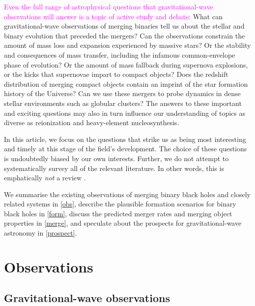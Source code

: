 \documentclass[iop,onecolumn]{revtex4}
\newcommand{\ilya}[1]{\textcolor{magenta}{#1}}
\begin{document}
\ilya{Even the full range of astrophysical questions that gravitational-wave observations will answer is a topic of active study and debate:} What can gravitational-wave observations of merging binaries tell us about the stellar and binary evolution that preceded the mergers?  Can the observations constrain the amount of mass loss and expansion experienced by massive stars? Or the stability and consequences of mass transfer, including the infamous common-envelope phase of evolution? Or the amount of mass fallback during supernova explosions, or the kicks that supernovae impart to compact objects? Does the redshift distribution of merging compact objects contain an imprint of the star formation history of the Universe?  Can we use these mergers to probe dynamics in dense stellar environments such as globular clusters? The answers to these important and exciting questions may also in turn influence our understanding of topics as diverse as reionization and heavy-element nucleosynthesis.

In this article, we focus on the questions that strike us as being most interesting and timely at this stage of the field's development.  The choice of these questions is undoubtedly biased by our own interests. Further, we do not attempt to systematically survey all of the relevant literature.  In other words, this is emphatically {\it not} a review \citep{magritte}. 

We summarise the existing observations of merging binary black holes and closely related systems in \autoref{obs}, describe the plausible formation scenarios for binary black holes in \autoref{form}, discuss the predicted merger rates and merging object properties in \autoref{merge}, and speculate about the prospects for gravitational-wave astronomy in \autoref{prospect}.


 

\section{Observations}\label{obs}

\subsection{Gravitational-wave observations}
\end{document}
